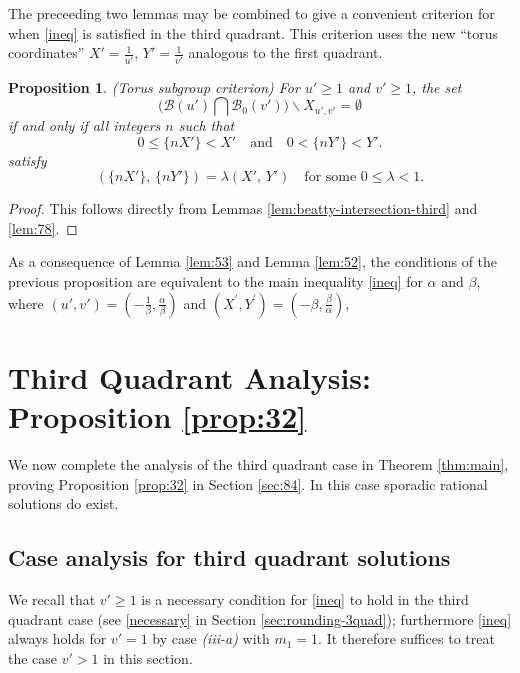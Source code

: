 \documentclass[12pt,letterpaper, reqno]{amsart}
\newtheorem{prop}[thm]{Proposition}
\theoremstyle{definition}
\theoremstyle{remark}
\newcommand{\uu}{{u'}}
\newcommand{\vv}{{v'}}
\newcommand{\sB}{{\mathcal B}}
\begin{document}
The preceeding two lemmas may be combined to give a convenient criterion for when \eqref{ineq} is satisfied in the third quadrant. This criterion uses the new ``torus coordinates'' $X' = \frac{1}{\uu}$, $Y' = \frac{1}{\vv}$ analogous to the first quadrant.

\begin{prop}\label{prop:torus-crit-third}
{\rm (Torus subgroup criterion)} 
For $\uu\geq 1$ and $\vv \geq 1$, the set
\[ 
\bigg( \sB({\uu}) \bigcap \sB_0({\vv})\bigg)  \smallsetminus  X_{\uu, \vv} 
 = \emptyset\]
if and only if all integers  $n$ such that
\begin{equation}
0 \le  \{ nX'\} <  X' \quad \mbox{and} \quad  0 < \{ n Y'\} <   Y'.
\end{equation}
satisfy 
\begin{equation}
(\{ nX'\}, \, \{nY'\}) = \lambda (X',\, Y')\quad \text{for some }0\leq\lambda <1.
\end{equation}
\end{prop}
\begin{proof}
This follows directly from Lemmas \ref{lem:beatty-intersection-third} and \ref{lem:78}.
\end{proof}

As a consequence of Lemma \ref{lem:53} and Lemma \ref{lem:52}, 
the conditions of the previous proposition are equivalent to the main inequality \eqref{ineq} for $\alpha$ and $\beta$, where
  $(\uu, \vv) = (-\frac{1}{\beta}, \frac{\alpha}{\beta})$ 
and $(X^{'}, Y^{'}) = (-{\beta}, \frac{\beta}{\alpha})$,



%
%

\section{Third Quadrant Analysis: Proposition \ref{prop:32}}

We now complete the analysis of the third quadrant case in Theorem \ref{thm:main}, proving Proposition \ref{prop:32}
in Section \ref{sec:84}. In this  case sporadic rational solutions do exist.

%
%
\subsection{Case analysis for  third quadrant solutions}\label{sec52a}
We recall that $\vv \geq 1$ is a necessary condition for 
\eqref{ineq} to hold 
 in the third quadrant case (see \eqref{necessary} in Section \ref{sec:rounding-3quad});  furthermore  \eqref{ineq} always holds
for $\vv=1$ by case {\it (iii-a)} with $m_1=1$.
It  therefore suffices to treat the case  $\vv>1$ in this section. 
\end{document}
